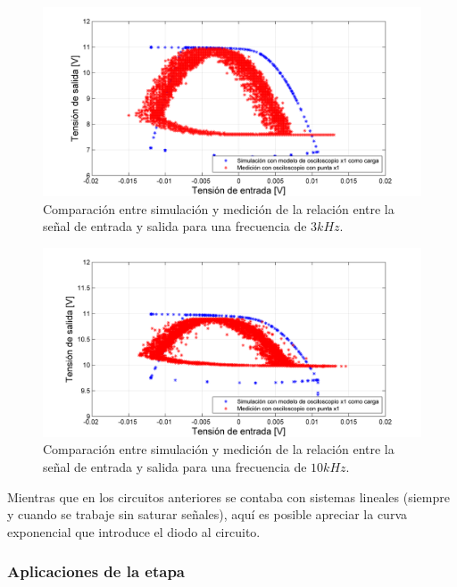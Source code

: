 \begin{figure}[H]
  \centering
\includegraphics[width=1.1\textwidth]{gfx_22/LOG_3}
  \caption{Comparación entre simulación y medición de la relación entre la señal de entrada y salida para una frecuencia de $3kHz$.}
  \label{v:log3}
\end{figure}



\begin{figure}[H]
  \centering
\includegraphics[width=1.1\textwidth]{gfx_22/LOG_10}
  \caption{Comparación entre simulación y medición de la relación entre la señal de entrada y salida para una frecuencia de $10kHz$.}
  \label{v:log10}
\end{figure}

Mientras que en los circuitos anteriores se contaba con sistemas lineales (siempre y cuando se trabaje sin saturar señales), aquí es posible apreciar la curva exponencial que introduce el diodo al circuito.


\subsubsection{Aplicaciones de la etapa}

